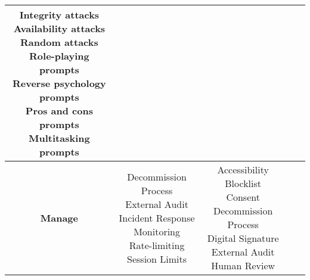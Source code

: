 \documentclass[fleqn]{article}
\begin{document}
\begin{landscape}
\begin{table}[H]
\begin{tabular}{|c|c|c|c|c|}
{			\textbullet\hspace{3pt} Integrity attacks  \\ 
			\textbullet\hspace{3pt} Availability attacks \\ 
			\textbullet\hspace{3pt} Random attacks \\ 
			\textbullet\hspace{3pt} Role-playing prompts \\
			\textbullet\hspace{3pt} Reverse psychology prompts \\
			\textbullet\hspace{3pt} Pros and cons prompts \\
			\textbullet\hspace{3pt} Multitasking prompts \\
		}
		\\
		\hline
		\textbf{Manage} & \makecell[l]{
			\textbullet\hspace{3pt} Decommission Process\\ 	
			\textbullet\hspace{3pt} External Audit\\ 
			\textbullet\hspace{3pt} Incident Response\\ 
			\textbullet\hspace{3pt} Monitoring\\
			\textbullet\hspace{3pt} Rate-limiting \\ 
			\textbullet\hspace{3pt} Session Limits\\						 	 
		}
		& \makecell[l]{
			\textbullet\hspace{3pt} Accessibility \\ 	
			\textbullet\hspace{3pt} Blocklist \\ 	
			\textbullet\hspace{3pt} Consent\\ 	
			\textbullet\hspace{3pt} Decommission Process\\ 	
			\textbullet\hspace{3pt} Digital Signature\\ 	
			\textbullet\hspace{3pt} External Audit\\ 
			\textbullet\hspace{3pt} Human Review \\ 
}
\end{tabular}
\end{table}
\end{landscape}
\end{document}
